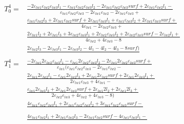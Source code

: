 \documentclass[a4paper,12pt]{article}
\begin{document}
\begin{align*}
    T_0^4 =& \frac{-2\varepsilon_{lw1}\varepsilon_{lw2}\varepsilon_{lw3}l_1 - \varepsilon_{lw1}\varepsilon_{lw2}\varepsilon_{lw3}l_2 - 2\varepsilon_{lw1}\varepsilon_{lw2}\varepsilon_{lw3}surf +2\varepsilon_{lw1}\varepsilon_{lw2}l_1 - }{\varepsilon_{lw1}\varepsilon_{lw2}\varepsilon_{lw3} - 2\varepsilon_{lw1}\varepsilon_{lw2} -2\varepsilon_{lw1}\varepsilon_{lw3} +}\\
    &\frac{\varepsilon_{lw1}\varepsilon_{lw2}l_3 + 2\varepsilon_{lw1}\varepsilon_{lw2}surf + 2\varepsilon_{lw1}\varepsilon_{lw3}l_1 + \varepsilon_{lw1}\varepsilon_{lw3}l_2 +2\varepsilon_{lw1}\varepsilon_{lw3}surf +}{ 4\varepsilon_{lw1} -2\varepsilon_{lw2}\varepsilon_{lw3} +}\\
    &\frac{ 2\varepsilon_{lw1}l_2 + 2\varepsilon_{lw1}l_3 + 3\varepsilon_{lw2}\varepsilon_{lw3}l_1 + 2\varepsilon_{lw2}\varepsilon_{lw3}l_2 +2\varepsilon_{lw2}\varepsilon_{lw3}surf - 2\varepsilon_{lw2}l_1 + }{4\varepsilon_{lw2} +4\varepsilon_{lw3} - 8}\\
    &\frac{2\varepsilon_{lw2}l_3 - 2\varepsilon_{lw3}l_1 - 2\varepsilon_{lw3}l_2 - 4l_1 - 4l_2 - 4l_3 - 8surf)}{}\\
    T_1^4=&\frac{-2\varepsilon_{lw1}2\varepsilon_{lw2}\varepsilon_{lw3}l_1 -                \varepsilon_{lw1}2\varepsilon_{lw2}\varepsilon_{lw3}l_ 2 - 2\varepsilon_{lw1}2\varepsilon_{lw2}\varepsilon_{lw3}surf +}{\varepsilon_{lw1}(\varepsilon_{lw1}\varepsilon_{lw2}\varepsilon_{lw3} - 2\varepsilon_{lw1}\varepsilon_{lw2} -}\\
    &\frac{2\varepsilon_{lw1}2\varepsilon_{lw2}l_1 - \varepsilon_{lw1}2\varepsilon_{lw2}l_3 + 2\varepsilon_{lw1}2\varepsilon_{lw2}surf + 2\varepsilon_{lw1}2\varepsilon_{lw3}l_1 +}{2\varepsilon_{lw1}\varepsilon_{lw3} + 4\varepsilon_{lw1} -}\\
    &\frac{\varepsilon_{lw1}2\varepsilon_{lw3}l_2 + 2\varepsilon_{lw1}2\varepsilon_{lw3}surf + 2\varepsilon_{lw1}2l_2 + 2\varepsilon_{lw1}2l_3 + }{2\varepsilon_{lw2}\varepsilon_{lw3} + 4\varepsilon_{lw2} + 4\varepsilon_{lw3} - 8)}\\
    &\frac{4\varepsilon_{lw1}\varepsilon_{lw2}\varepsilon_{lw3}l_1 + 2\varepsilon_{lw1}\varepsilon_{lw2}\varepsilon_{lw3}l_2 + 3\varepsilon_{lw1}\varepsilon_{lw2}\varepsilon_{lw3}surf -}{}\\
    &\frac{4\varepsilon_{lw1}\varepsilon_{lw2}l_1 + 2\varepsilon_{lw1}\varepsilon_{lw2}l_3 - 2\varepsilon_{lw1}\varepsilon_{lw2}surf - 4\varepsilon_{lw1}\varepsilon_{lw3}l_1 - }{}\\

\end{align*}
\end{document}

